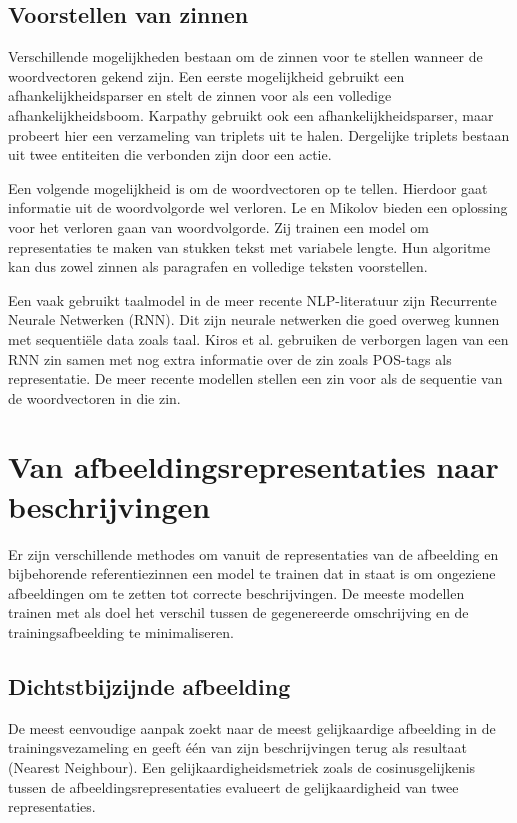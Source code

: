 \subsection{Voorstellen van zinnen}
 Verschillende mogelijkheden bestaan om de zinnen voor te stellen wanneer de woordvectoren gekend zijn. Een eerste mogelijkheid gebruikt een afhankelijkheidsparser en stelt de zinnen voor als een volledige afhankelijkheidsboom\cite{Socher2014}. Karpathy\cite{Karpathy2014} gebruikt ook een afhankelijkheidsparser, maar probeert hier een verzameling van triplets uit te halen. Dergelijke triplets bestaan uit twee entiteiten die verbonden zijn door een actie. 

 Een volgende mogelijkheid is om de woordvectoren op te telle\cite{Lebret2013}n. Hierdoor gaat informatie uit de woordvolgorde wel verloren. Le en Mikolov\cite{Le2014a} bieden een oplossing voor het verloren gaan van woordvolgorde. Zij trainen een model om representaties te maken van stukken tekst met variabele lengte. Hun algoritme kan dus zowel zinnen als paragrafen en volledige teksten voorstellen.

 Een vaak gebruikt taalmodel in de meer recente NLP-literatuur zijn Recurrente Neurale Netwerken (RNN)\cite{Mikolov2010}. Dit zijn neurale netwerken die goed overweg kunnen met sequenti\"ele data zoals taal. Kiros et al.\cite{Kiros2013} gebruiken  de verborgen lagen van een RNN zin samen met nog extra informatie over de zin zoals POS-tags als representatie. De meer recente modellen stellen een zin voor als de sequentie van de woordvectoren in die zin.
 
\section{Van afbeeldingsrepresentaties naar beschrijvingen}
Er zijn verschillende methodes om vanuit de representaties van de afbeelding en bijbehorende referentiezinnen een model te trainen dat in staat is om ongeziene afbeeldingen om te zetten tot correcte beschrijvingen. 
De meeste modellen trainen met als doel het verschil tussen de gegenereerde omschrijving en de trainingsafbeelding te minimaliseren.

\subsection{Dichtstbijzijnde afbeelding}
De meest eenvoudige aanpak zoekt naar de meest gelijkaardige afbeelding in de trainingsvezameling en geeft \'e\'en van zijn beschrijvingen terug als resultaat (Nearest Neighbour)\cite{Devlin2015a}. Een gelijkaardigheidsmetriek zoals de cosinusgelijkenis tussen de afbeeldingsrepresentaties evalueert de gelijkaardigheid van twee representaties.

